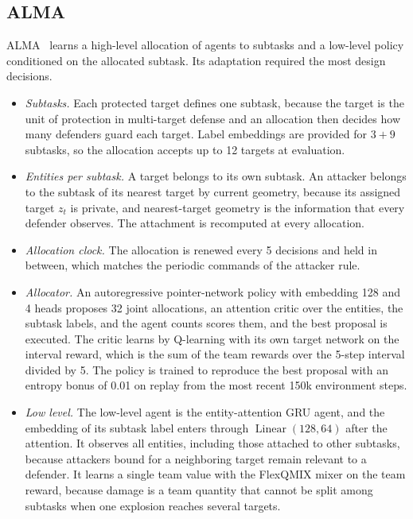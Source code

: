 \subsection{ALMA}
ALMA~\cite{iqbal2022alma} learns a high-level allocation of agents to subtasks and a low-level policy conditioned on the allocated subtask. Its adaptation required the most design decisions.
\begin{itemize}
\item \emph{Subtasks.} Each protected target defines one subtask, because the target is the unit of protection in multi-target defense and an allocation then decides how many defenders guard each target. Label embeddings are provided for $3+9$ subtasks, so the allocation accepts up to 12 targets at evaluation.
\item \emph{Entities per subtask.} A target belongs to its own subtask. An attacker belongs to the subtask of its nearest target by current geometry, because its assigned target $z_t$ is private, and nearest-target geometry is the information that every defender observes. The attachment is recomputed at every allocation.
\item \emph{Allocation clock.} The allocation is renewed every 5 decisions and held in between, which matches the periodic commands of the attacker rule.
\item \emph{Allocator.} An autoregressive pointer-network policy with embedding 128 and 4 heads proposes 32 joint allocations, an attention critic over the entities, the subtask labels, and the agent counts scores them, and the best proposal is executed. The critic learns by Q-learning with its own target network on the interval reward, which is the sum of the team rewards over the 5-step interval divided by 5. The policy is trained to reproduce the best proposal with an entropy bonus of 0.01 on replay from the most recent 150k environment steps.
\item \emph{Low level.} The low-level agent is the entity-attention GRU agent, and the embedding of its subtask label enters through $\operatorname{Linear}(128,64)$ after the attention. It observes all entities, including those attached to other subtasks, because attackers bound for a neighboring target remain relevant to a defender. It learns a single team value with the FlexQMIX mixer on the team reward, because damage is a team quantity that cannot be split among subtasks when one explosion reaches several targets.
\end{itemize}

